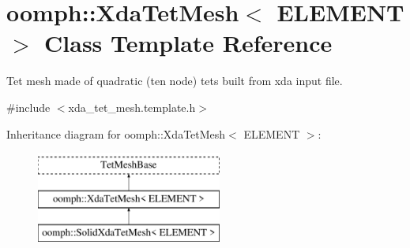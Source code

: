 \hypertarget{classoomph_1_1XdaTetMesh}{}\section{oomph\+:\+:Xda\+Tet\+Mesh$<$ E\+L\+E\+M\+E\+NT $>$ Class Template Reference}
\label{classoomph_1_1XdaTetMesh}


Tet mesh made of quadratic (ten node) tets built from xda input file.  




{\ttfamily \#include $<$xda\+\_\+tet\+\_\+mesh.\+template.\+h$>$}

Inheritance diagram for oomph\+:\+:Xda\+Tet\+Mesh$<$ E\+L\+E\+M\+E\+NT $>$\+:\begin{figure}[H]
\begin{center}
\leavevmode
\includegraphics[height=3.000000cm]{classoomph_1_1XdaTetMesh}
\end{center}
\end{figure}
